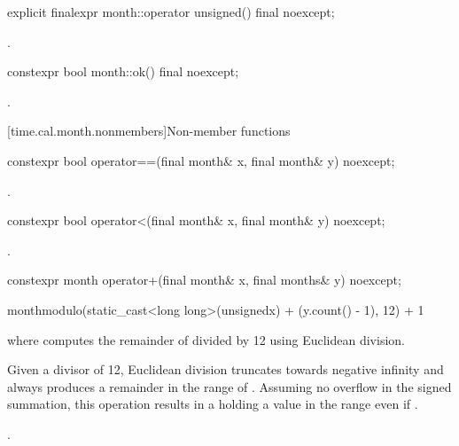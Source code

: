 %
\begin{itemdecl}
explicit finalexpr month::operator unsigned() final noexcept;
\end{itemdecl}

\begin{itemdescr}
\pnum
\returns {}.
\end{itemdescr}

%
\begin{itemdecl}
constexpr bool month::ok() final noexcept;
\end{itemdecl}

\begin{itemdescr}
\pnum
\returns {}.
\end{itemdescr}

[time.cal.month.nonmembers]{Non-member functions}

%
\begin{itemdecl}
constexpr bool operator==(final month& x, final month& y) noexcept;
\end{itemdecl}

\begin{itemdescr}
\pnum
\returns {}.
\end{itemdescr}

%
\begin{itemdecl}
constexpr bool operator<(final month& x, final month& y) noexcept;
\end{itemdecl}

\begin{itemdescr}
\pnum
\returns {}.
\end{itemdescr}

%
\begin{itemdecl}
constexpr month operator+(final month& x, final months& y) noexcept;
\end{itemdecl}

\begin{itemdescr}
\pnum
\returns
\begin{codeblock}
month{modulo(static_cast<long long>(unsigned{x}) + (y.count() - 1), 12) + 1}
\end{codeblock}
where  computes the remainder of  divided by 12 using Euclidean division.
\begin{note}
Given a divisor of 12, Euclidean division truncates towards negative infinity and
always produces a remainder in the range of .
Assuming no overflow in the signed summation,
this operation results in a  holding a value in the range  even if .
\end{note}
\begin{example}
.
\end{example}
\end{itemdescr}


